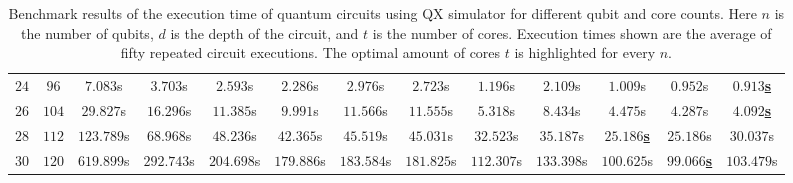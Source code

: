 \begin{table}[ht]
\begin{adjustwidth}{-1.1cm}{-1.1cm}
{\begin{tabular}{ccccccccccccc}
            $24$ & $96$ & $7.083$s & $3.703$s & $2.593$s & $2.286$s & $2.976$s & $2.723$s & $1.196$s & $2.109$s & $1.009$s & $0.952$s & \underline{$\mathbf{0.913}$\textbf{s}} \\
            $26$ & $104$ & $29.827$s & $16.296$s & $11.385$s & $9.991$s & $11.566$s & $11.555$s & $5.318$s & $8.434$s & $4.475$s & $4.287$s & \underline{$\mathbf{4.092}$\textbf{s}} \\
            $28$ & $112$ & $123.789$s & $68.968$s & $48.236$s & $42.365$s & $45.519$s & $45.031$s & $32.523$s & $35.187$s & \underline{$\mathbf{25.186}$\textbf{s}} & $25.186$s & $30.037$s \\
            $30$ & $120$ & $619.899$s & $292.743$s & $204.698$s & $179.886$s & $183.584$s & $181.825$s & $112.307$s & $133.398$s & $100.625$s & \underline{$\mathbf{99.066}$\textbf{s}} & $103.479$s \\
            
        \end{tabular}
    }
    \end{adjustwidth}
    \caption[Benchmark results of the execution time of quantum circuits using QX simulator for different qubit and core counts.]{
        Benchmark results of the execution time of quantum circuits using QX simulator for different qubit and core counts.
        Here $n$ is the number of qubits, $d$ is the depth of the circuit, and $t$ is the number of cores.
        Execution times shown are the average of fifty repeated circuit executions.
        The optimal amount of cores $t$ is highlighted for every $n$.
    }
\end{table}